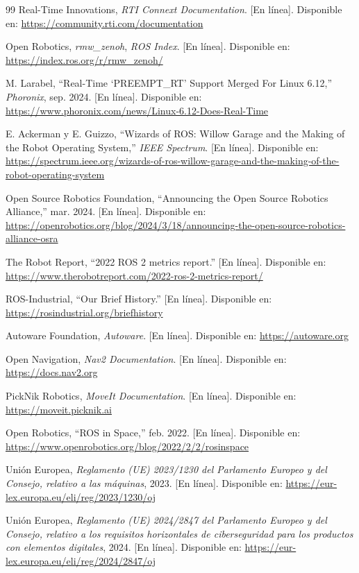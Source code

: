 \documentclass[DOC]{UTNLSE}
\begin{document}
\begin{thebibliography}{99}
Real-Time Innovations, \emph{RTI Connext Documentation}. [En línea].
Disponible en: \url{https://community.rti.com/documentation}

Open Robotics, \emph{rmw\_zenoh}, \emph{ROS Index}. [En línea]. Disponible
en: \url{https://index.ros.org/r/rmw_zenoh/}

M. Larabel, ``Real-Time `PREEMPT\_RT' Support Merged For Linux 6.12,''
\emph{Phoronix}, sep. 2024. [En línea]. Disponible en:
\url{https://www.phoronix.com/news/Linux-6.12-Does-Real-Time}

E. Ackerman y E. Guizzo, ``Wizards of ROS: Willow Garage and the Making of
the Robot Operating System,'' \emph{IEEE Spectrum}. [En línea]. Disponible en:
\url{https://spectrum.ieee.org/wizards-of-ros-willow-garage-and-the-making-of-the-robot-operating-system}

Open Source Robotics Foundation, ``Announcing the Open Source Robotics
Alliance,'' mar. 2024. [En línea]. Disponible en:
\url{https://openrobotics.org/blog/2024/3/18/announcing-the-open-source-robotics-alliance-osra}

The Robot Report, ``2022 ROS 2 metrics report.'' [En línea]. Disponible en:
\url{https://www.therobotreport.com/2022-ros-2-metrics-report/}

ROS-Industrial, ``Our Brief History.'' [En línea]. Disponible en:
\url{https://rosindustrial.org/briefhistory}

Autoware Foundation, \emph{Autoware}. [En línea]. Disponible en:
\url{https://autoware.org}

Open Navigation, \emph{Nav2 Documentation}. [En línea]. Disponible en:
\url{https://docs.nav2.org}

PickNik Robotics, \emph{MoveIt Documentation}. [En línea]. Disponible en:
\url{https://moveit.picknik.ai}

Open Robotics, ``ROS in Space,'' feb. 2022. [En línea]. Disponible en:
\url{https://www.openrobotics.org/blog/2022/2/2/rosinspace}

Unión Europea, \emph{Reglamento (UE) 2023/1230 del Parlamento Europeo y del
Consejo, relativo a las máquinas}, 2023. [En línea]. Disponible en:
\url{https://eur-lex.europa.eu/eli/reg/2023/1230/oj}

Unión Europea, \emph{Reglamento (UE) 2024/2847 del Parlamento Europeo y del
Consejo, relativo a los requisitos horizontales de ciberseguridad para los
productos con elementos digitales}, 2024. [En línea]. Disponible en:
\url{https://eur-lex.europa.eu/eli/reg/2024/2847/oj}


\end{thebibliography}
\end{document}
